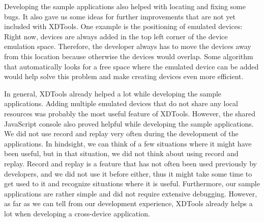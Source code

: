 Developing the sample applications also helped with locating and fixing some bugs. It also gave us some ideas for further improvements that are not yet included with XDTools. One example is the positioning of emulated devices: Right now, devices are always added in the top left corner of the device emulation space. Therefore, the developer always has to move the devices away from this location because otherwise the devices would overlap. Some algorithm that automatically looks for a free space where the emulated device can be added would help solve this problem and make creating devices even more efficient.

In general, XDTools already helped a lot while developing the sample applications. Adding multiple emulated devices that do not share any local resources was probably the most useful feature of XDTools. However, the shared JavaScript console also proved helpful while developing the sample applications. We did not use record and replay very often during the development of the applications. In hindsight, we can think of a few situations where it might have been useful, but in that situation, we did not think about using record and replay. Record and replay is a feature that has not often been used previously by developers, and we did not use it before either, thus it might take some time to get used to it and recognize situations where it is useful. Furthermore, our sample applications are rather simple and did not require extensive debugging. However, as far as we can tell from our development experience, XDTools already helps a lot when developing a cross-device application.